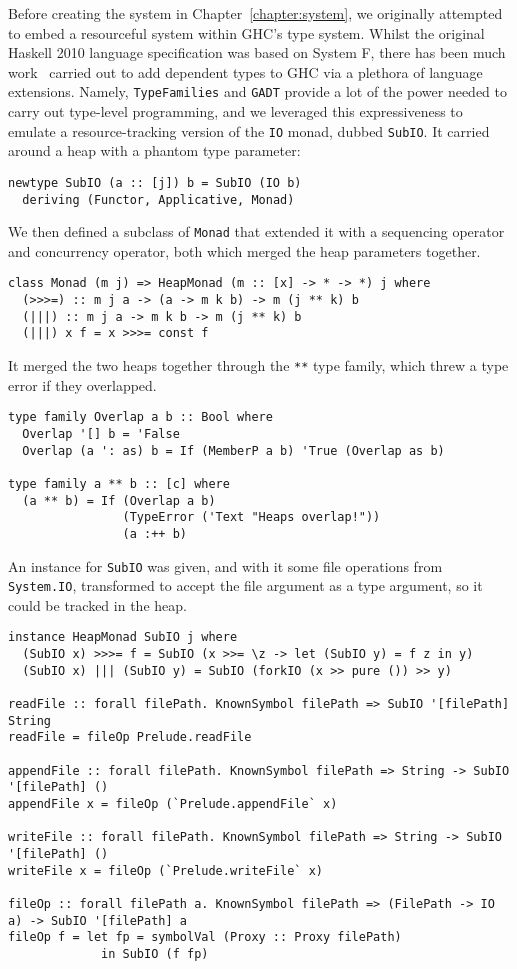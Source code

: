 
Before creating the system in Chapter~\ref{chapter:system}, we
originally attempted to embed a resourceful system within GHC's type
system. Whilst the original Haskell 2010 language specification was
based on System F, there has been much
work~\cite{eisenberg2016}\cite{weirich2017} carried out to add
dependent types to GHC via a plethora of language extensions. Namely,
\texttt{TypeFamilies} and \texttt{GADT} provide a lot of the power
needed to carry out type-level programming, and we leveraged this
expressiveness to emulate a resource-tracking version of the
\texttt{IO} monad, dubbed \texttt{SubIO}. It
carried around a heap with a phantom type parameter:
\begin{verbatim}
newtype SubIO (a :: [j]) b = SubIO (IO b)
  deriving (Functor, Applicative, Monad)
\end{verbatim}
We then defined a subclass of \texttt{Monad} that
extended it with a sequencing operator and concurrency operator, both
which merged the heap parameters together.
\begin{verbatim}
class Monad (m j) => HeapMonad (m :: [x] -> * -> *) j where
  (>>>=) :: m j a -> (a -> m k b) -> m (j ** k) b
  (|||) :: m j a -> m k b -> m (j ** k) b
  (|||) x f = x >>>= const f
\end{verbatim}
It merged the two heaps together through the \texttt{**} type family,
which threw a type error if they overlapped.
\begin{verbatim}
type family Overlap a b :: Bool where
  Overlap '[] b = 'False
  Overlap (a ': as) b = If (MemberP a b) 'True (Overlap as b)

type family a ** b :: [c] where
  (a ** b) = If (Overlap a b)
                (TypeError ('Text "Heaps overlap!"))
                (a :++ b)
\end{verbatim}
An instance for \texttt{SubIO} was given, and with it
some file operations from \texttt{System.IO}, transformed to accept
the file argument as a type argument, so it could be tracked in the heap.
\begin{verbatim}
instance HeapMonad SubIO j where
  (SubIO x) >>>= f = SubIO (x >>= \z -> let (SubIO y) = f z in y)
  (SubIO x) ||| (SubIO y) = SubIO (forkIO (x >> pure ()) >> y)

readFile :: forall filePath. KnownSymbol filePath => SubIO '[filePath] String
readFile = fileOp Prelude.readFile

appendFile :: forall filePath. KnownSymbol filePath => String -> SubIO '[filePath] ()
appendFile x = fileOp (`Prelude.appendFile` x)

writeFile :: forall filePath. KnownSymbol filePath => String -> SubIO '[filePath] ()
writeFile x = fileOp (`Prelude.writeFile` x)

fileOp :: forall filePath a. KnownSymbol filePath => (FilePath -> IO a) -> SubIO '[filePath] a
fileOp f = let fp = symbolVal (Proxy :: Proxy filePath)
             in SubIO (f fp)
\end{verbatim}
